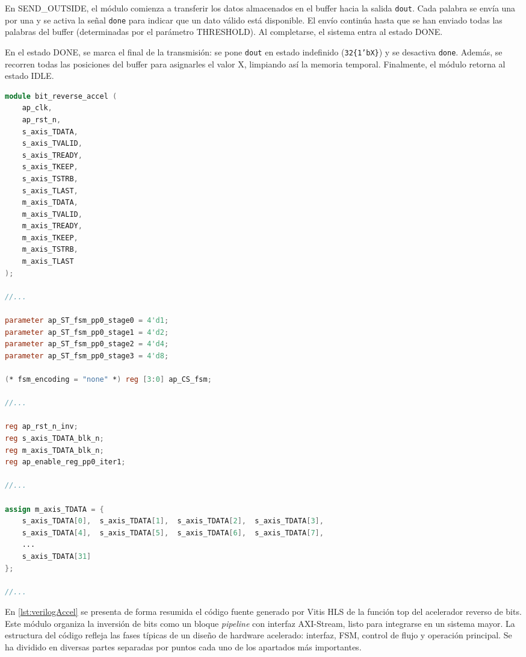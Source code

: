 \begin{adjustwidth}{1.5cm}{}
En SEND\_OUTSIDE, el módulo comienza a transferir los datos almacenados en el buffer hacia la salida \texttt{dout}. Cada palabra se envía una por una y se activa la señal \texttt{done} para indicar que un dato válido está disponible. El envío continúa hasta que se han enviado todas las palabras del buffer (determinadas por el parámetro THRESHOLD). Al completarse, el sistema entra al estado DONE.

En el estado DONE, se marca el final de la transmisión: se pone \texttt{dout} en estado indefinido (\texttt{{32\{1'bX\}}}) y se desactiva \texttt{done}. Además, se recorren todas las posiciones del buffer para asignarles el valor X, limpiando así la memoria temporal. Finalmente, el módulo retorna al estado IDLE.

\begin{lstlisting}[language=verilog,frame=single,caption={Definición del módulo y puertos}, showstringspaces=false,label=lst:verilogAccel]
module bit_reverse_accel (
    ap_clk,
    ap_rst_n,
    s_axis_TDATA,
    s_axis_TVALID,
    s_axis_TREADY,
    s_axis_TKEEP,
    s_axis_TSTRB,
    s_axis_TLAST,
    m_axis_TDATA,
    m_axis_TVALID,
    m_axis_TREADY,
    m_axis_TKEEP,
    m_axis_TSTRB,
    m_axis_TLAST
);

//...

parameter ap_ST_fsm_pp0_stage0 = 4'd1;
parameter ap_ST_fsm_pp0_stage1 = 4'd2;
parameter ap_ST_fsm_pp0_stage2 = 4'd4;
parameter ap_ST_fsm_pp0_stage3 = 4'd8;

(* fsm_encoding = "none" *) reg [3:0] ap_CS_fsm;

//...

reg ap_rst_n_inv;
reg s_axis_TDATA_blk_n;
reg m_axis_TDATA_blk_n;
reg ap_enable_reg_pp0_iter1;

//...

assign m_axis_TDATA = { 
    s_axis_TDATA[0],  s_axis_TDATA[1],  s_axis_TDATA[2],  s_axis_TDATA[3],
    s_axis_TDATA[4],  s_axis_TDATA[5],  s_axis_TDATA[6],  s_axis_TDATA[7],
    ...
    s_axis_TDATA[31]
};

//...

\end{lstlisting}

En \ref{lst:verilogAccel} se presenta de forma resumida el código fuente generado por Vitis HLS de la función top del acelerador reverso de bits. Este módulo organiza la inversión de bits como un bloque \textit{pipeline} con interfaz AXI-Stream, listo para integrarse en un sistema mayor. La estructura del código refleja las fases típicas de un diseño de hardware acelerado: interfaz, FSM, control de flujo y operación principal.
Se ha dividido en diversas partes separadas por puntos cada uno de los apartados más importantes.


\end{adjustwidth}
